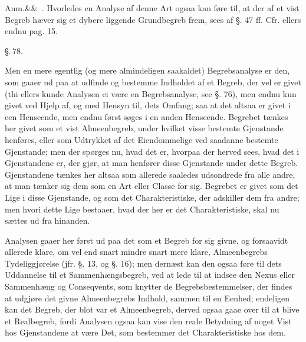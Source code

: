 \documentclass[12pt]{book}
\def\sperr#1{#1}%
\def\textit#1{#1}%
\def\emph#1{#1}%
\newcommand{\sperr}[1]{\textls[180]{#1}}
\newcommand{\parag}[1]{%
  \par\vspace{0.9\baselineskip}%
  {\centering\textit{\S.\,#1.}\par}%
  \vspace{0.35\baselineskip}%
  \noindent\hspace{\parindent}\ignorespaces
}
\newcommand{\anm}[1]{%
  \par\vspace{0.5\baselineskip}%
  \noindent\hspace{\parindent}\sperr{Anm.}\ifx&#1&\else~\textit{#1}.\fi
  \enspace\ignorespaces
}
\newcommand{\opage}[1]{\marginnote{\footnotesize\textit{[#1]}}}
\begin{document}
\anm{} Hvorledes en Analyse af denne Art ogsaa kan føre til, at der af et vist
Begreb hæver sig et dybere liggende Grundbegreb frem, sees af §. 47 ff. Cfr.
ellers endnu pag. 15.

\opage{211} \parag{78}
Men en mere egentlig (og mere almindeligen saakaldet) Begrebsanalyse er den, som
gaaer ud paa at udfinde og bestemme Indholdet af et Begreb, der vel er givet (thi
ellers kunde Analysen ei være en Begrebsanalyse, see §. 76), men endnu kun givet
ved Hjelp af, og med Hensyn til, dets Omfang; saa at det altsaa er givet i een
Henseende, men endnu først søges i en anden Henseende. Begrebet tænkes her givet
som et vist Almeenbegreb, under hvilket visse bestemte Gjenstande henføres, eller
som Udtrykket af det Eiendommelige ved saadanne bestemte Gjenstande; men der
spørges nu, hvad det er, hvorpaa der herved sees, hvad det i Gjenstandene er, der
gjør, at man henfører disse Gjenstande under dette Begreb. Gjenstandene tænkes
her altsaa som allerede saaledes udsondrede fra alle andre, at man tænker sig dem
som en Art eller Classe for sig. Begrebet er givet som det Lige i disse
Gjenstande, og som det Charakteristiske, der adskiller dem fra andre; men hvori
dette Lige bestaaer, hvad der her er det Charakteristiske, skal nu sættes ud fra
hinanden.

Analysen gaaer her først ud paa det som et Begreb for sig givne, og forsaavidt
allerede klare, om vel end snart mindre snart mere klare, Almeenbegrebs
\emph{Tydeliggjørelse} (jfr. §. 13, og §. 16); men dernæst kan den ogsaa føre til
dets Uddannelse til et \emph{Sammenhængsbegreb}, ved at lede til at indsee den
Nexus eller Sammenhæng
\opage{212} og Conseqvents, som knytter de Begrebsbestemmelser, der findes at udgjøre
det givne Almeenbegrebs Indhold, sammen til en Eenhed; endeligen kan det Begreb,
der blot var et Almeenbegreb, derved ogsaa gaae over til at blive et
\emph{Realbegreb}, fordi Analysen ogsaa kan vise den reale Betydning af noget
Vist hos Gjenstandene at være Det, som bestemmer det Charakteristiske hos dem.
\end{document}
